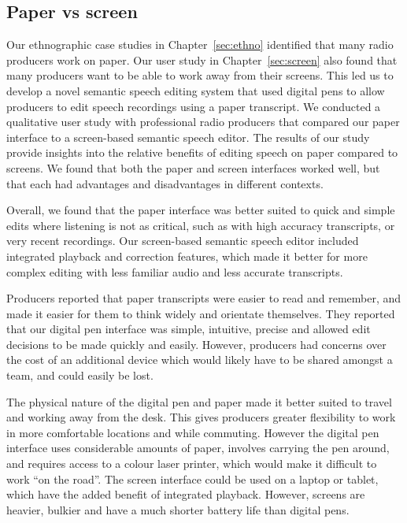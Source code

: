 \subsection{Paper vs screen}

Our ethnographic case studies in Chapter~\ref{sec:ethno} identified that many radio producers work on paper.
Our user study in Chapter~\ref{sec:screen} also found that many producers want to be able to work away from their
screens.  This led us to develop a novel semantic speech editing system that used digital pens to allow producers to
edit speech recordings using a paper transcript.  We conducted a qualitative user study with professional radio producers
that compared our paper interface to a screen-based semantic speech editor. The results of our study provide insights
into the relative benefits of editing speech on paper compared to screens. We found that both the paper and screen
interfaces worked well, but that each had advantages and disadvantages in different contexts.

Overall, we found that the paper interface was better suited to quick and simple edits where listening is not as
critical, such as with high accuracy transcripts, or very recent recordings.  Our screen-based semantic speech editor
included integrated playback and correction features, which made it better for more complex editing with less familiar
audio and less accurate transcripts.

Producers reported that paper transcripts were easier to read and remember, and made it easier for them to think widely
and orientate themselves.  They reported that our digital pen interface was simple, intuitive, precise and allowed edit
decisions to be made quickly and easily.  However, producers had concerns over the cost of an additional device which
would likely have to be shared amongst a team, and could easily be lost.

The physical nature of the digital pen and paper made it better suited to travel and working away from the desk. This
gives producers greater flexibility to work in more comfortable locations and while commuting.  However the digital pen
interface uses considerable amounts of paper, involves carrying the pen around, and requires access to a colour laser
printer, which would make it difficult to work ``on the road''.  The screen interface could be used on a laptop or
tablet, which have the added benefit of integrated playback. However, screens are heavier, bulkier and have a much
shorter battery life than digital pens.

